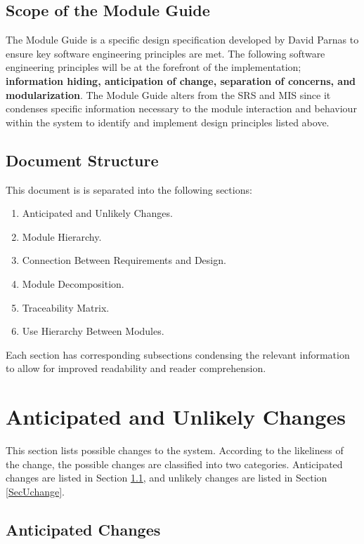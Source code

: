 \documentclass[12pt, titlepage]{article}
\begin{document}
\subsection{Scope of the Module Guide} \label{scope}
The Module Guide is a specific design specification developed by David Parnas to ensure key software engineering principles are met. The following software engineering principles will be at the forefront of the implementation; \textbf{information hiding, anticipation of change, separation of concerns, and modularization}. The Module Guide alters from the SRS and MIS since it condenses specific information necessary to the module interaction and behaviour within the system to identify and implement design principles listed above.

\subsection{Document Structure} \label{structure}
This document is is separated into the following sections:
\begin{enumerate}
    \item Anticipated and Unlikely Changes.
    \item Module Hierarchy.
    \item Connection Between Requirements and Design.
    \item Module Decomposition.
    \item Traceability Matrix.
    \item Use Hierarchy Between Modules.
\end{enumerate}
Each section has corresponding subsections condensing the relevant information to allow for improved readability and reader comprehension. 

\section{Anticipated and Unlikely Changes} \label{SecChange}

This section lists possible changes to the system. According to the likeliness
of the change, the possible changes are classified into two
categories. Anticipated changes are listed in Section \ref{SecAchange}, and
unlikely changes are listed in Section \ref{SecUchange}.

\subsection{Anticipated Changes} \label{SecAchange}
\end{document}
